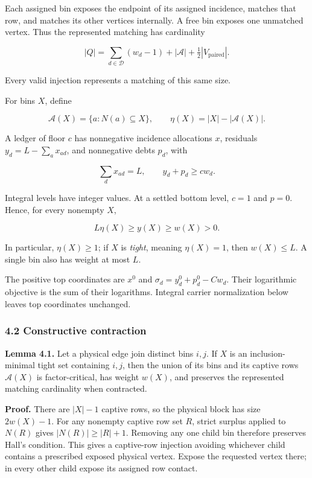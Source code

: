 Each assigned bin exposes the endpoint of its assigned incidence, matches that row, and matches its other vertices internally. A free bin exposes one unmatched vertex. Thus the represented matching has cardinality

\[
|Q|=\sum_{d\in\mathcal D}(w_d-1)+|\mathcal A|
                      +\tfrac12|V_{\mathrm{paired}}|.
 \tag{5}
\]

Every valid injection represents a matching of this same size.

For bins \(X\), define

\[
\mathcal A(X)=\{a:N(a)\subseteq X\},\qquad
 \eta(X)=|X|-|\mathcal A(X)|.
 \tag{6}
\]

A ledger of floor \(c\) has nonnegative incidence allocations \(x\), residuals \(y_d=L-\sum_a x_{ad}\), and nonnegative debts \(p_d\), with

\[
\sum_d x_{ad}=L,\qquad y_d+p_d\geq c w_d.
 \tag{7}
\]

Integral levels have integer values. At a settled bottom level, \(c=1\) and \(p=0\). Hence, for every nonempty \(X\),

\[
L\eta(X)\geq y(X)\geq w(X)>0.
 \tag{8}
\]

In particular, \(\eta(X)\geq1\); if \(X\) is \emph{tight}, meaning \(\eta(X)=1\), then \(w(X)\leq L\). A single bin also has weight at most \(L\).

The positive top coordinates are \(x^0\) and \(\sigma_d=y_d^0+p_d^0-Cw_d\). Their logarithmic objective is the sum of their logarithms. Integral carrier normalization below leaves top coordinates unchanged.

\hypertarget{af-46593eb93e-constructive-contraction}{%
\subsubsection{4.2 Constructive contraction}\label{af-46593eb93e-constructive-contraction}}

\textbf{Lemma 4.1.} Let a physical edge join distinct bins \(i,j\). If \(X\) is an inclusion-minimal tight set containing \(i,j\), then the union of its bins and its captive rows \(\mathcal A(X)\) is factor-critical, has weight \(w(X)\), and preserves the represented matching cardinality when contracted.

\textbf{Proof.} There are \(|X|-1\) captive rows, so the physical block has size \(2w(X)-1\). For any nonempty captive row set \(R\), strict surplus applied to \(N(R)\) gives \(|N(R)|\geq |R|+1\). Removing any one child bin therefore preserves Hall's condition. This gives a captive-row injection avoiding whichever child contains a prescribed exposed physical vertex. Expose the requested vertex there; in every other child expose its assigned row contact.

